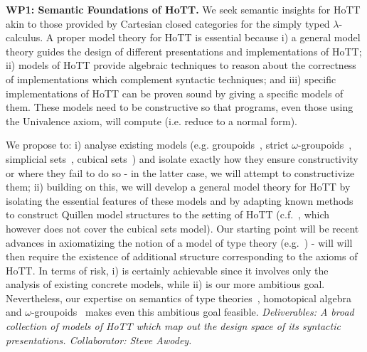 \documentclass[a4paper,11pt]{article}
\begin{document}





{\bf WP1: Semantic Foundations of HoTT.}  We seek semantic insights
for HoTT akin to those provided by Cartesian closed categories for
the simply typed $\lambda$-calculus.  A proper model theory for
HoTT is essential because i) a general model theory 
guides the design of different presentations and implementations of
HoTT; ii) models of HoTT provide algebraic techniques to reason
about the correctness of implementations which complement syntactic
techniques; and iii) specific implementations of HoTT can
be proven sound by giving a specific models of them.  These models
need to be constructive so that programs, even those using the
Univalence axiom, will compute ({i.e.} reduce to a normal form). 

We propose to: i) analyse existing models ({e.g.}
groupoids~\cite{HofmannM:groitt}, strict
$\omega$-groupoids~\cite{WarrenM:strgit}, simplicial
sets~\cite{KapulkinC:simmuv}, cubical sets~\cite{BezemM:cubsmt}) and
isolate exactly how they ensure constructivity or where they fail to
do so - in the latter case, we will attempt to constructivize them;
ii) building on this, we will develop a general model theory for HoTT
by isolating the essential features of these models and by adapting
known methods to construct Quillen model structures to the setting of
HoTT ({c.f.}~\cite{ShulmanM:uniidh}, which however does not cover the
cubical sets model).  Our starting point will be recent advances in
axiomatizing the notion of a model of type theory
({e.g.}~\cite{AwodeyS:natmtt}) - will will then require the existence
of additional structure corresponding to the axioms of HoTT. In terms
of risk, i) is certainly achievable since it involves only the
analysis of existing concrete models, while ii) is our more ambitious
goal. Nevertheless, our expertise on semantics of type
theories~\cite{neil2014relParamDep}, homotopical
algebra~\cite{GambinoN:homl2c,GambinoN:weilsh} and
$\omega$-groupoids~\cite{alti:csl12} makes even this ambitious goal
feasible. {\em Deliverables: A broad collection of models of HoTT
  which map out the design space of its syntactic
  presentations. Collaborator: Steve Awodey.}
\end{document}
